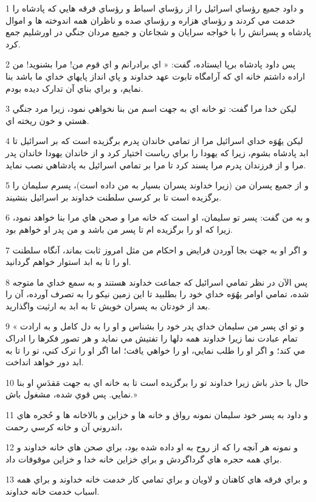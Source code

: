 \par 1 و داود جميع رؤساي اسرائيل را از رؤساي اسباط و رؤساي فرقه هايي که پادشاه را خدمت مي کردند و رؤساي هزاره و رؤساي صده و ناظران همه اندوخته ها و اموال پادشاه و پسرانش را با خواجه سرايان و شجاعان و جميع مردان جنگي در اورشليم جمع کرد.
\par 2 پس داود پادشاه برپا ايستاده، گفت: « اي برادرانم و اي قوم من! مرا بشنويد! من اراده داشتم خانه اي که آرامگاه تابوت عهد خداوند و پاي انداز پايهاي خداي ما باشد بنا نمايم، و براي بناي آن تدارک ديده بودم.
\par 3 ليکن خدا مرا گفت: تو خانه اي به جهت اسم من بنا نخواهي نمود، زيرا مرد جنگي هستي و خون ريخته اي.
\par 4 ليکن يهُوَه خداي اسرائيل مرا از تمامي خاندان پدرم برگزيده است که بر اسرائيل تا ابد پادشاه بشوم، زيرا که يهودا را براي رياست اختيار کرد و از خاندان يهودا خاندان پدر مرا و از فرزندان پدرم مرا پسند کرد تا مرا بر تمامي اسرائيل به پادشاهي نصب نمايد.
\par 5 و از جميع پسران من (زيرا خداوند پسران بسيار به من داده است)، پسرم سليمان را برگزيده است تا بر کرسي سلطنت خداوند بر اسرائيل بنشيند.
\par 6 و به من گفت: پسر تو سليمان، او است که خانه مرا و صحن هاي مرا بنا خواهد نمود، زيرا که او را برگزيده ام تا پسر من باشد و من پدر او خواهم بود.
\par 7 و اگر او به جهت بجا آوردن فرايض و احکام من مثل امروز ثابت بماند، آنگاه سلطنت او را تا به ابد استوار خواهم گردانيد.
\par 8 پس الآن در نظر تمامي اسرائيل که جماعت خداوند هستند و به سمع خداي ما متوجه شده، تمامي اوامر يهُوَه خداي خود را بطلبيد تا اين زمين نيکو را به تصرف آورده، آن را بعد از خودتان به پسران خويش تا به ابد به ارثيت واگذاريد.
\par 9 « و تو اي پسر من سليمان خداي پدر خود را بشناس و او را به دل کامل و به ارادت تمام عبادت نما زيرا خداوند همه دلها را تفتيش مي نمايد و هر تصور فکرها را ادراک مي کند؛ و اگر او را طلب نمايي، او را خواهي يافت؛ اما اگر او را ترک کني، تو را تا به ابد دور خواهد انداخت.
\par 10 حال با حذر باش زيرا خداوند تو را برگزيده است تا به خانه اي به جهت مَقدَسِ او بنا نمايي. پس قوي شده، مشغول باش.»
\par 11 و داود به پسر خود سليمان نمونه رواق و خانه ها و خزاين و بالاخانه ها و حُجره هاي اندروني آن و خانه کرسي رحمت،
\par 12 و نمونه هر آنچه را که از روح به او داده شده بود، براي صحن هاي خانه خداوند و براي همه حجره هاي گرداگردش و براي خزاين خانه خدا و خزاين موقوفات داد.
\par 13 و براي فرقه هاي کاهنان و لاويان و براي تمامي کار خدمت خانه خداوند و براي همه اسباب خدمت خانه خداوند.
